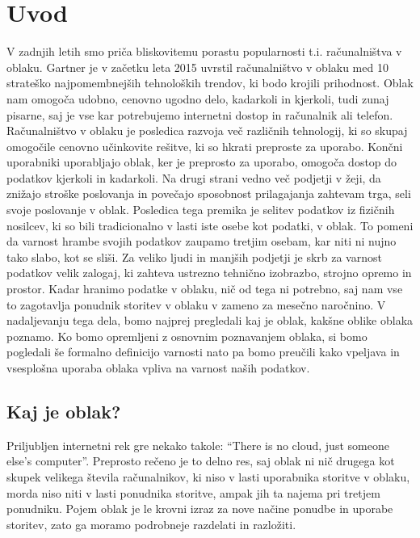 \documentclass[12pt,a4paper,openany]{book}
\begin{document}

\chapter{Uvod}

V zadnjih letih smo priča bliskovitemu porastu popularnosti t.i. računalništva v oblaku. Gartner je v začetku leta 2015 uvrstil računalništvo v oblaku med 10 strateško najpomembnejših tehnoloških trendov, ki bodo krojili prihodnost. Oblak nam omogoča udobno, cenovno ugodno delo, kadarkoli in kjerkoli, tudi zunaj pisarne, saj je vse kar potrebujemo internetni dostop in računalnik ali telefon. Računalništvo v oblaku je posledica razvoja več različnih tehnologij, ki so skupaj omogočile cenovno učinkovite rešitve, ki so hkrati preproste za uporabo. Končni uporabniki uporabljajo oblak, ker je preprosto za uporabo, omogoča dostop do podatkov kjerkoli in kadarkoli. Na drugi strani vedno več podjetji v žeji, da znižajo stroške poslovanja in povečajo sposobnost prilagajanja zahtevam trga, seli svoje poslovanje v oblak. Posledica tega premika je selitev podatkov iz fizičnih nosilcev, ki so bili tradicionalno v lasti iste osebe kot podatki, v oblak. To pomeni da varnost hrambe svojih podatkov zaupamo tretjim osebam, kar niti ni nujno tako slabo, kot se sliši. Za veliko ljudi in manjših podjetji je skrb za varnost podatkov velik zalogaj, ki zahteva ustrezno tehnično izobrazbo, strojno opremo in prostor. Kadar hranimo podatke v oblaku, nič od tega ni potrebno, saj nam vse to zagotavlja ponudnik storitev v oblaku v zameno za mesečno naročnino. V nadaljevanju tega dela, bomo najprej pregledali kaj je oblak, kakšne oblike oblaka poznamo. Ko bomo opremljeni z osnovnim poznavanjem oblaka, si bomo pogledali še formalno definicijo varnosti nato pa bomo preučili kako vpeljava in vsesplošna uporaba oblaka vpliva na varnost naših podatkov.

\section{Kaj je oblak?}
Priljubljen internetni rek gre nekako takole: “There is no cloud, just someone else's computer”. Preprosto rečeno je to delno res, saj oblak ni nič drugega kot skupek velikega števila računalnikov, ki niso v lasti uporabnika storitve v oblaku, morda niso niti v lasti ponudnika storitve, ampak jih ta najema pri tretjem ponudniku. Pojem oblak je le krovni izraz za nove načine ponudbe in uporabe storitev, zato ga moramo podrobneje razdelati in razložiti.
\end{document}
